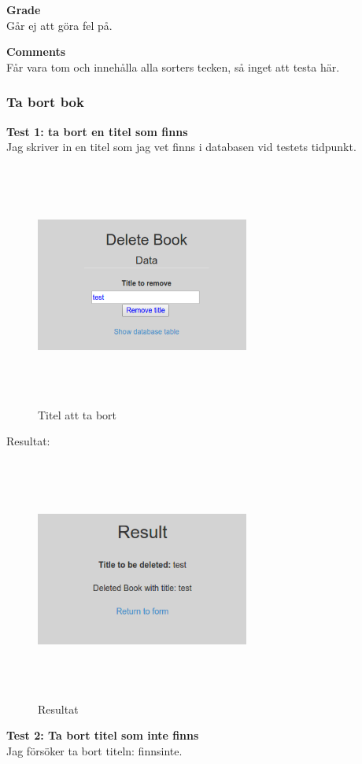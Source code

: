 \documentclass[11pt, titlepage, oneside, a4paper]{article}
\newcommand{\Subsubsection}[1]{\vspace{-4pt}\subsubsection{#1}\vspace{-8pt}}
\begin{document}
		\textbf{Grade} \\
		Går ej att göra fel på.
		
		\textbf{Comments} \\
		Får vara tom och innehålla alla sorters tecken, så inget att testa här.
		
		\newpage
		\Subsubsection{Ta bort bok}
		\textbf{Test 1: ta bort en titel som finns}\\
		Jag skriver in en titel som jag vet finns i databasen vid testets tidpunkt.
		\begin{figure}[ht!]
		\centering
		\includegraphics[width=70mm, height=80mm]{del2_del.png}
		\caption{Titel att ta bort}
		\end{figure}
		
		Resultat:
		\begin{figure}[ht!]
		\centering
		\includegraphics[width=70mm, height=80mm]{del2_del_res.png}
		\caption{Resultat}
		\end{figure}
		
		\newpage
		\textbf{Test 2: Ta bort titel som inte finns} \\
		Jag försöker ta bort titeln: finnsinte.
		
\end{document}

